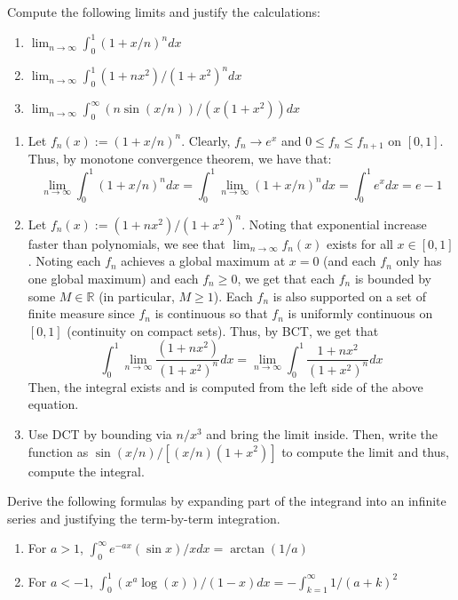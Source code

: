 \documentclass[12pt]{article}
\newenvironment{solution}[2][Solution]{\begin{trivlist}
\item[\hskip \labelsep {\bfseries #1}]}{\end{trivlist}}
\newenvironment{problem}[2][Problem]{\begin{trivlist}
\item[\hskip \labelsep {\bfseries #1}\hskip \labelsep {\bfseries #2.}]}{\end{trivlist}}
\begin{document}
\begin{problem}{3}
    Compute the following limits and justify the calculations:
    \begin{enumerate}
        \item $\lim_{n\to\infty} \int_0^1 (1+x/n)^ndx$
        \item $\lim_{n\to\infty} \int_0^1 (1+nx^2)/(1+x^2)^ndx$
        \item $\lim_{n\to\infty} \int_0^{\infty} (n\sin(x/n))/(x(1+x^2))dx$
    \end{enumerate}
\end{problem}
\begin{solution}{}
	\begin{enumerate}
		\item[(i.)] Let $f_n(x) := (1+x/n)^n$. Clearly, $f_n\to e^x$ and $0\leq f_n \leq f_{n+1}$ on $[0,1]$. Thus, by monotone convergence theorem, we have that:
		\[ \lim_{n\to\infty} \int_0^1 (1+x/n)^ndx = \int_0^1 \lim_{n\to\infty} (1+x/n)^ndx = \int_0^1 e^xdx = e-1 \]
		\item[(ii.)] Let $f_n(x) := (1+nx^2)/(1+x^2)^n$. Noting that exponential increase faster than polynomials, we see that $\lim_{n\to\infty} f_n(x)$ exists for all $x\in[0,1]$.  Noting
		each $f_n$ achieves a global maximum at $x=0$ (and each $f_n$ only has one global maximum) and each $f_n\geq 0$, we get that each $f_n$ is bounded by some
		$M\in\mathbb{R}$ (in particular, $M\geq1$). Each $f_n$ is also supported on a set of finite measure since $f_n$ is continuous so that $f_n$ is uniformly continuous on
		$[0,1]$ (continuity on compact sets). Thus, by BCT, we get that 
		\[ \int_0^1 \lim_{n\to\infty} \frac{(1+nx^2)}{(1+x^2)^n}dx = \lim_{n\to\infty} \int_0^1 \frac{1+nx^2}{(1+x^2)^n}dx  \]
		Then, the integral exists and is computed from the left side of the above equation.
		\item[(iii.)] Use DCT by bounding via $n/x^3$ and bring the limit inside. Then, write the function as $\sin(x/n)/[(x/n)(1+x^2)]$ to compute the limit and thus, compute
		the integral.
	\end{enumerate}
\end{solution}

\newpage
\begin{problem}{4}
    Derive the following formulas by expanding part of the integrand into an infinite series and justifying the term-by-term
    integration.
    \begin{enumerate}
        \item For $a>1$, $\int_0^{\infty} e^{-ax}(\sin{x})/xdx = \arctan(1/a)$
        \item For $a<-1$, $\int_0^1 (x^a\log(x))/(1-x)dx = -\int_{k=1}^{\infty} 1/(a+k)^2$
    \end{enumerate}
\end{problem}
\end{document}

